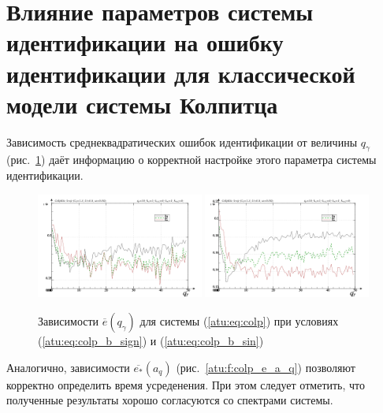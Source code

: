 
\section{Влияние параметров системы идентификации на ошибку идентификации для классической модели системы Колпитца}  %

Зависимость среднеквадратических ошибок идентификации от величины $q_\gamma$ (рис.~\ref{atu:f:colp_e_qgamma})
даёт информацию о корректной настройке этого параметра системы идентификации.

\begin{figure}[htb!]
\centerline{
  \includegraphics[width=0.49\textwidth]{p/mod/colp_m5p-p_qg_e_sign.png}
  \includegraphics[width=0.49\textwidth]{p/mod/colp_m5p-p_qg_e_sin.png}
}
  \caption{Зависимости  $\overline{e}(q_\gamma)$ для системы (\ref{atu:eq:colp})
  при условиях (\ref{atu:eq:colp_b_sign}) и (\ref{atu:eq:colp_b_sin})
}
\label{atu:f:colp_e_qgamma}
\end{figure}



Аналогично, зависимости $\overline{e_*}(a_q)$ (рис.~\ref{atu:f:colp_e_a_q})
позволяют корректно определить время усреденения.
При этом следует отметить, что
полученные результаты хорошо согласуются со спектрами системы.

